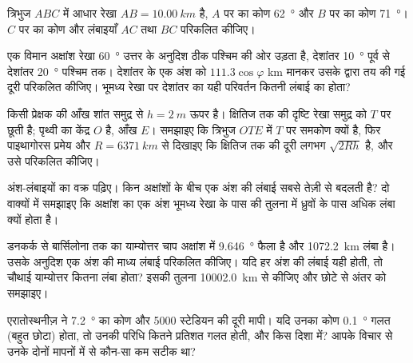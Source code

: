 \begin{exercise}[$\star\star$]\label{exo:g10:measuring-the-earth:7}
त्रिभुज $ABC$ में आधार रेखा $AB = \qty{10.00}{km}$ है, $A$ पर का कोण
\qty{62}{\degree} और $B$ पर का कोण \qty{71}{\degree}। $C$ पर का
कोण और लंबाइयाँ $AC$ तथा $BC$ परिकलित कीजिए।
\end{exercise}

\begin{exercise}[$\star\star$]\label{exo:g10:measuring-the-earth:8}
एक विमान अक्षांश रेखा \qty{60}{\degree} उत्तर के अनुदिश ठीक पश्चिम की ओर उड़ता है,
देशांतर \qty{10}{\degree} पूर्व से देशांतर \qty{20}{\degree} पश्चिम तक। देशांतर के एक अंश
को $111.3 \cos \varphi$ km मानकर उसके द्वारा तय की गई दूरी परिकलित कीजिए।
भूमध्य रेखा पर देशांतर का यही परिवर्तन कितनी लंबाई का होता?
\end{exercise}

\begin{exercise}[$\star\star$]\label{exo:g10:measuring-the-earth:9}
किसी प्रेक्षक की आँख शांत समुद्र से $h = \qty{2}{m}$ ऊपर है। क्षितिज तक की दृष्टि रेखा
समुद्र को $T$ पर छूती है; पृथ्वी का केंद्र $O$ है, आँख
$E$। समझाइए कि त्रिभुज $OTE$ में $T$ पर समकोण क्यों है, फिर
पाइथागोरस प्रमेय और $R = \qty{6371}{km}$ से दिखाइए कि
क्षितिज तक की दूरी लगभग $\sqrt{2Rh}$ है, और उसे परिकलित कीजिए।
\end{exercise}

\begin{exercise}[$\star\star$]\label{exo:g10:measuring-the-earth:10}
अंश-लंबाइयों का वक्र पढ़िए। किन अक्षांशों के बीच एक अंश की लंबाई सबसे तेज़ी से बदलती
है? दो वाक्यों में समझाइए कि अक्षांश का एक अंश भूमध्य रेखा के पास की तुलना में ध्रुवों के
पास अधिक लंबा क्यों होता है।
\end{exercise}

\begin{exercise}[$\star\star$]\label{exo:g10:measuring-the-earth:11}
डनकर्क से बार्सिलोना तक का याम्योत्तर चाप अक्षांश में \qty{9.646}{\degree} फैला है और
\qty{1072.2}{km} लंबा है। उसके अनुदिश एक अंश की माध्य लंबाई परिकलित कीजिए। यदि
हर अंश की लंबाई यही होती, तो चौथाई याम्योत्तर कितना लंबा होता? इसकी तुलना
\qty{10002.0}{km} से कीजिए और छोटे से अंतर को
समझाइए।
\end{exercise}

\begin{exercise}[$\star\star\star$]\label{exo:g10:measuring-the-earth:12}
एरातोस्थनीज़ ने \qty{7.2}{\degree} का कोण और 5000 स्टेडियन की दूरी मापी। यदि
उनका कोण \qty{0.1}{\degree} गलत (बहुत छोटा) होता, तो उनकी परिधि कितने प्रतिशत
गलत होती, और किस दिशा में? आपके विचार से उनके दोनों मापनों में से कौन-सा कम सटीक था?
\end{exercise}


